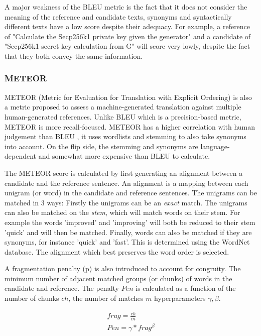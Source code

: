 A major weakness of the BLEU metric is the fact that it does not consider the meaning of the reference and candidate texts, synonyms and syntactically different texts have a low score despite their adequacy. For example, a reference of "Calculate the Secp256k1 private key given the generator" and a candidate of "Secp256k1 secret key calculation from G" will score very lowly, despite the fact that they both convey the same information. 

\subsubsection{METEOR}
METEOR (Metric for Evaluation for Translation with Explicit Ordering) \cite{Meteor} is also a metric proposed to assess a machine-generated translation against multiple human-generated references. Unlike BLEU which is a precision-based metric, METEOR is more recall-focused. METEOR has a higher correlation with human judgement than BLEU \cite{recommend_summarization}, it uses wordlists and stemming to also take synonyms into account. On the flip side, the stemming and synonyms are language-dependent and somewhat more expensive than BLEU to calculate.

The METEOR score is calculated by first generating an alignment between a candidate and the reference sentence. An alignment is a mapping between each unigram (or word) in the candidate and reference sentences. The unigrams can be matched in 3 ways: Firstly the unigrams can be an \textit{exact} match. The unigrams can also be matched on the \textit{stem}, which will match words on their stem. For example the words 'improved' and 'improving' will both be reduced to their stem 'quick' and will then be matched. Finally, words can also be matched if they are synonyms, for instance 'quick' and 'fast'. This is determined using the WordNet database. The alignment which best preserves the word order is selected. 

A fragmentation penalty (p) is also introduced to account for congruity. The minimum number of adjacent matched groups (or chunks) of words in the candidate and reference. The penalty \(Pen\) is calculated as a function of the number of chunks \(ch\), the number of matches \(m\) hyperparameters \(\gamma, \beta\).

\begin{equation}
\begin{aligned}
frag = \frac{ch}{m} \\
Pen = \gamma * frag^{\beta}
\end{aligned}
\end{equation}

